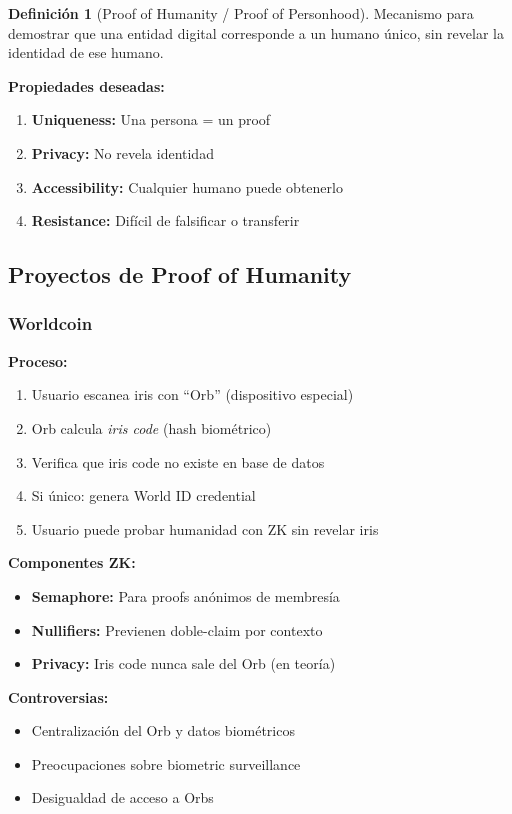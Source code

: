 \documentclass[11pt,a4paper,twoside]{book}
\theoremstyle{definition}
\newtheorem{definition}{Definición}[chapter]
\theoremstyle{remark}
\begin{document}
\begin{definition}[Proof of Humanity / Proof of Personhood]
Mecanismo para demostrar que una entidad digital corresponde a un humano único, sin revelar la identidad de ese humano.

\textbf{Propiedades deseadas:}
\begin{enumerate}
    \item \textbf{Uniqueness:} Una persona = un proof
    \item \textbf{Privacy:} No revela identidad
    \item \textbf{Accessibility:} Cualquier humano puede obtenerlo
    \item \textbf{Resistance:} Difícil de falsificar o transferir
\end{enumerate}
\end{definition}

\subsection{Proyectos de Proof of Humanity}

\subsubsection{Worldcoin}

\begin{mathnote}
\textbf{Proceso:}
\begin{enumerate}
    \item Usuario escanea iris con ``Orb'' (dispositivo especial)
    \item Orb calcula \textit{iris code} (hash biométrico)
    \item Verifica que iris code no existe en base de datos
    \item Si único: genera World ID credential
    \item Usuario puede probar humanidad con ZK sin revelar iris
\end{enumerate}

\textbf{Componentes ZK:}
\begin{itemize}
    \item \textbf{Semaphore:} Para proofs anónimos de membresía
    \item \textbf{Nullifiers:} Previenen doble-claim por contexto
    \item \textbf{Privacy:} Iris code nunca sale del Orb (en teoría)
\end{itemize}

\textbf{Controversias:}
\begin{itemize}
    \item Centralización del Orb y datos biométricos
    \item Preocupaciones sobre biometric surveillance
    \item Desigualdad de acceso a Orbs
\end{itemize}
\end{mathnote}
\end{document}
